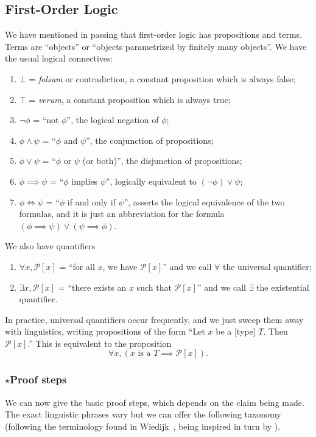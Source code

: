 \subsection{First-Order Logic}
We have mentioned in passing that first-order logic has propositions and
terms. Terms are ``objects'' or ``objects parametrized by finitely many
objects''. We have the usual logical connectives:
\begin{enumerate}
\item $\bot$ = \textit{falsum} or contradiction, a constant proposition which is
  always false;
\item $\top$ = \textit{verum}, a constant proposition which is always true;
\item $\neg\phi$ = ``not $\phi$'', the logical negation of $\phi$;
\item $\phi\land\psi$ = ``$\phi$ and $\psi$'', the conjunction of propositions;
\item $\phi\lor\psi$ = ``$\phi$ or $\psi$ (or both)'', the disjunction
  of propositions;
\item $\phi\implies\psi$ = ``$\phi$ implies $\psi$'', logically
  equivalent to $(\neg\phi)\lor\psi$;
\item $\phi\iff\psi$ = ``$\phi$ if and only if $\psi$'', asserts the
  logical equivalence of the two formulas, and it is just an
  abbreviation for the formula $(\phi\implies\psi)\lor(\psi\implies\phi)$.
\end{enumerate}
We also have quantifiers
\begin{enumerate}
\item $\forall x,\mathcal{P}[x]$ = ``for all $x$, we have
  $\mathcal{P}[x]$'' and we call $\forall$ the universal quantifier;
\item $\exists x,\mathcal{P}[x]$ = ``there exists an $x$ such that
  $\mathcal{P}[x]$'' and we call $\exists$ the existential quantifier.
\end{enumerate}
In practice, universal quantifiers occur frequently, and we just sweep
them away with linguistics, writing propositions of the form ``Let $x$
be a [type] $T$. Then $\mathcal{P}[x]$.'' This is equivalent to the
proposition
\begin{equation}
\forall x, (x\mbox{ is a }T\implies\mathcal{P}[x]).
\end{equation}

\subsubsection{$\star$Proof steps}
We can now give the basic proof steps, which depends on the claim being
made. The exact linguistic phrases vary but we can offer the following
taxonomy (following the terminology found in Wiedijk~\cite{wiedijk-2000-mv},
being inspired in turn by \Mizar).

